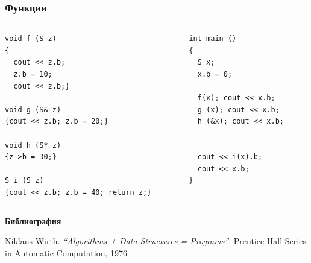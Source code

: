 \documentclass{beamer}
\begin{document}
\begin{frame}[fragile]
\frametitle{Функции}


\begin{columns}[t]
  \begin{column}{0.6\textwidth}

\begin{flushleft}
\begin{lstlisting}
void f (S z)
{
  cout << z.b;
  z.b = 10;
  cout << z.b;}

void g (S& z)
{cout << z.b; z.b = 20;}

void h (S* z)
{z->b = 30;}

S i (S z)
{cout << z.b; z.b = 40; return z;}

\end{lstlisting}
\end{flushleft}
  \end{column}
  \begin{column}{0.4\textwidth}

\begin{flushleft}
\begin{lstlisting}
int main ()
{
  S x;
  x.b = 0;

  f(x); cout << x.b;
  g (x); cout << x.b;
  h (&x); cout << x.b;


  cout << i(x).b;
  cout << x.b;
}
\end{lstlisting}
\end{flushleft}


  \end{column}
\end{columns}



\end{frame}



\textbf {Библиография}
\begin{thebibliography}{9}

 Niklaus Wirth.  \emph{``Algorithms + Data Structures = Programs''}, Prentice-Hall Series in Automatic Computation, 1976

\end{thebibliography}
\end{document}
